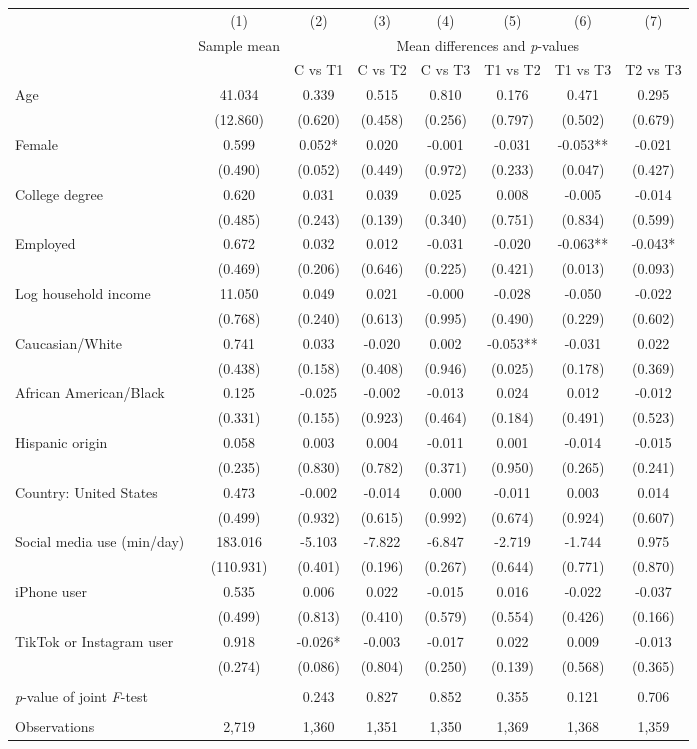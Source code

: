 \begin{tabular}{l*{7}c}
\toprule
 & (1) & (2) & (3) & (4) & (5) & (6) & (7) \\
 & \multicolumn{1}{c}{Sample mean} & \multicolumn{6}{c}{Mean differences and \textit{p}-values}\\ \cmidrule(lr){2-2} \cmidrule(lr){3-8}
  &  & C vs T1 & C vs T2 & C vs T3 & T1 vs T2 & T1 vs T3 & T2 vs T3 \\
\midrule
Age&41.034&0.339&0.515&0.810&0.176&0.471&0.295\\
&(12.860)&(0.620)&(0.458)&(0.256)&(0.797)&(0.502)&(0.679)\\
Female&0.599&0.052*&0.020&-0.001&-0.031&-0.053**&-0.021\\
&(0.490)&(0.052)&(0.449)&(0.972)&(0.233)&(0.047)&(0.427)\\
College degree&0.620&0.031&0.039&0.025&0.008&-0.005&-0.014\\
&(0.485)&(0.243)&(0.139)&(0.340)&(0.751)&(0.834)&(0.599)\\
Employed&0.672&0.032&0.012&-0.031&-0.020&-0.063**&-0.043*\\
&(0.469)&(0.206)&(0.646)&(0.225)&(0.421)&(0.013)&(0.093)\\
Log household income&11.050&0.049&0.021&-0.000&-0.028&-0.050&-0.022\\
&(0.768)&(0.240)&(0.613)&(0.995)&(0.490)&(0.229)&(0.602)\\
Caucasian/White&0.741&0.033&-0.020&0.002&-0.053**&-0.031&0.022\\
&(0.438)&(0.158)&(0.408)&(0.946)&(0.025)&(0.178)&(0.369)\\
African American/Black&0.125&-0.025&-0.002&-0.013&0.024&0.012&-0.012\\
&(0.331)&(0.155)&(0.923)&(0.464)&(0.184)&(0.491)&(0.523)\\
Hispanic origin&0.058&0.003&0.004&-0.011&0.001&-0.014&-0.015\\
&(0.235)&(0.830)&(0.782)&(0.371)&(0.950)&(0.265)&(0.241)\\
Country: United States&0.473&-0.002&-0.014&0.000&-0.011&0.003&0.014\\
&(0.499)&(0.932)&(0.615)&(0.992)&(0.674)&(0.924)&(0.607)\\
Social media use (min/day)&183.016&-5.103&-7.822&-6.847&-2.719&-1.744&0.975\\
&(110.931)&(0.401)&(0.196)&(0.267)&(0.644)&(0.771)&(0.870)\\
iPhone user&0.535&0.006&0.022&-0.015&0.016&-0.022&-0.037\\
&(0.499)&(0.813)&(0.410)&(0.579)&(0.554)&(0.426)&(0.166)\\
TikTok or Instagram user&0.918&-0.026*&-0.003&-0.017&0.022&0.009&-0.013\\
&(0.274)&(0.086)&(0.804)&(0.250)&(0.139)&(0.568)&(0.365)\\
& & & & & & & \\ \textit{p}-value of joint \textit{F}-test & & 0.243 & 0.827 & 0.852 & 0.355 & 0.121 & 0.706 \\ & & & & & & & \\ \midrule
Observations & 2,719 & 1,360 & 1,351 & 1,350 & 1,369 & 1,368 & 1,359 \\
\bottomrule
\end{tabular}
